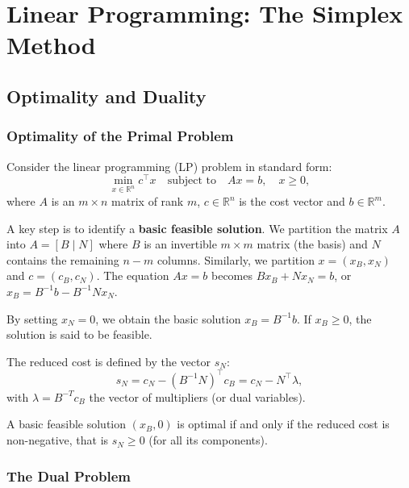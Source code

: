 \chapter{Linear Programming: The Simplex Method}
\label{chap:linear-programming}

\section{Optimality and Duality}

\subsection{Optimality of the Primal Problem}

Consider the linear programming (LP) problem in standard form:
\begin{equation}
    \min_{x \in \mathbb{R}^n} c^\top x \quad \text{subject to} \quad Ax = b, \quad x \geq 0,
\end{equation}
where $A$ is an $m \times n$ matrix of rank $m$, $c \in \mathbb{R}^n$ is the cost vector and $b \in \mathbb{R}^m$.

A key step is to identify a \textbf{basic feasible solution}. We partition the matrix $A$ into $A = [B \mid N]$ where $B$ is an invertible $m \times m$ matrix (the basis) and $N$ contains the remaining $n-m$ columns. Similarly, we partition $x = (x_B, x_N)$ and $c = (c_B, c_N)$.
The equation $Ax=b$ becomes $Bx_B + Nx_N = b$, or $x_B = B^{-1}b - B^{-1}Nx_N$.

By setting $x_N = 0$, we obtain the basic solution $x_B = B^{-1}b$. If $x_B \ge 0$, the solution is said to be feasible.

The reduced cost is defined by the vector $s_N$:
\begin{equation}
    s_N = c_N - (B^{-1}N)^\top c_B = c_N - N^\top \lambda,
\end{equation}
with $\lambda = B^{-T} c_B$ the vector of multipliers (or dual variables).

\begin{theoreme}
    A basic feasible solution $(x_B, 0)$ is optimal if and only if the reduced cost is non-negative, that is $s_N \geq 0$ (for all its components).
\end{theoreme}

\subsection{The Dual Problem}

